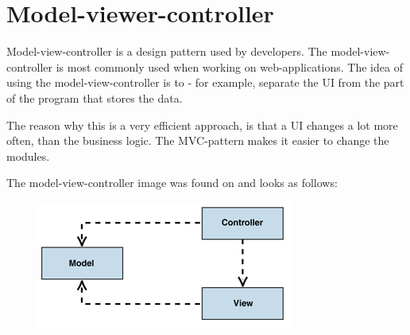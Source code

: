 \section{Model-viewer-controller}


Model-view-controller is a design pattern used by developers\cite{mvcasp}. The model-view-controller is most commonly used when working on web-applications\cite{mvcasp}. The idea of using the model-view-controller is to - for example, separate the UI from the part of the program that stores the data\cite{modelviewcontroller}. 

The reason why this is a very efficient approach, is that a UI changes a lot more often, than the business logic\cite{modelviewcontroller}. The MVC-pattern makes it easier to change the modules\cite{modelviewcontroller}.


The model-view-controller image was found on\cite{modelviewcontroller} and looks as follows:

\begin{figure}[h]
	\centering
		\includegraphics{design/figures/model-view-controller.png}
	\label{fig:model-view-controller}
\end{figure}



